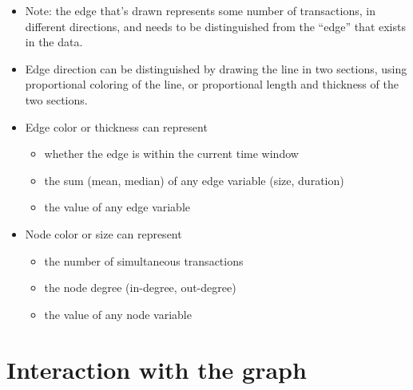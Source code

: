 \documentclass[11pt]{article}
\begin{document}
\begin{itemize} \itemsep 0em

\item Note: the edge that's drawn represents some number of
  transactions, in different directions, and needs to be
  distinguished from the ``edge'' that exists in the data.

\item Edge direction can be distinguished by drawing the line in
  two sections, using proportional coloring of the line, or
  proportional length and thickness of the two sections.

\item Edge color or thickness can represent

  \begin{itemize} \itemsep 0em
  \item whether the edge is within the current time window
  \item the sum (mean, median) of any edge variable (size, duration)
  \item the value of any edge variable
  \end{itemize}

\item  Node color or size can represent
  \begin{itemize} \itemsep 0em
  \item the number of simultaneous transactions
  \item the node degree (in-degree, out-degree)
  \item the value of any node variable
  \end{itemize}

\end {itemize}


\section{Interaction with the graph}
\end{document}
